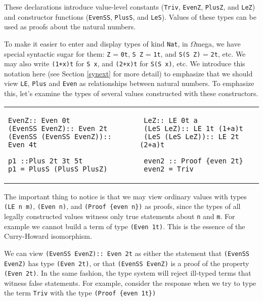 \documentclass[11pt,twoside,A4]{llncs}
\newcommand{\om}{\emph{$\Omega$}mega}
\begin{document}
\noindent
These declarations introduce value-level constants ({\tt Triv}, {\tt EvenZ}, {\tt PlusZ}, and
{\tt LeZ}) and constructor functions ({\tt EvenSS}, {\tt PlusS}, and {\tt LeS}).
Values of these types can be used as proofs about the natural numbers.

To make it easier to enter and display types of kind \verb+Nat+, 
in \om,  we have special syntactic sugar for them:
{\tt Z} = \verb+0t+,
\verb+S Z+ = \verb+1t+, and
\verb+S(S Z)+ = \verb+2t+, 
etc. We may also write \verb|(1+x)t| for \verb|S x|,
 and  \verb|(2+x)t| for \verb|S(S x)|, etc.
We introduce this notation here (see Section \ref{synext} for more detail)
to emphasize that we should view {\tt LE}, {\tt Plus} and {\tt Even}
as relationships
between natural numbers. To emphasize this,
let's examine the types of several values constructed with these
constructors. 

\vspace*{.2in}
\begin{tabular}{l|l}
\begin{minipage}[t]{2.4in}
{\small
\begin{verbatim}
EvenZ:: Even 0t
(EvenSS EvenZ):: Even 2t
(EvenSS (EvenSS EvenZ)):: Even 4t

p1 ::Plus 2t 3t 5t
p1 = PlusS (PlusS PlusZ)
\end{verbatim}}
\end{minipage}
&
\begin{minipage}[t]{3.0in}
{\small
\begin{verbatim}
 LeZ:: LE 0t a
 (LeS LeZ):: LE 1t (1+a)t
 (LeS (LeS LeZ)):: LE 2t (2+a)t
 
 even2 :: Proof {even 2t}
 even2 = Triv
\end{verbatim}}
\end{minipage}
\end{tabular}
\vspace*{.05in}

\noindent
The important thing to notice is 
that we may view ordinary values with types 
\verb+(LE n m)+, \verb+(Even n)+, and \verb+(Proof {even n})+ as proofs, since the types of all 
legally constructed values witness only true statements about {\tt n} and {\tt m}. 
For example we cannot build a term of type \verb+(Even 1t)+. This is the essence
of the Curry-Howard isomorphism. 

We can view \verb+(EvenSS EvenZ):: Even 2t+
as either the statement that \verb+(EvenSS EvenZ)+ has type \verb+(Even 2t)+,
or that \verb+(EvenSS EvenZ)+ is a proof of the property \verb+(Even 2t)+.
In the same fashion, the type system will reject ill-typed terms that witness false
statements. For example, consider the response when we
try to type the term {\tt Triv} with the type {\tt (Proof \{even 1t\})}
\end{document}
